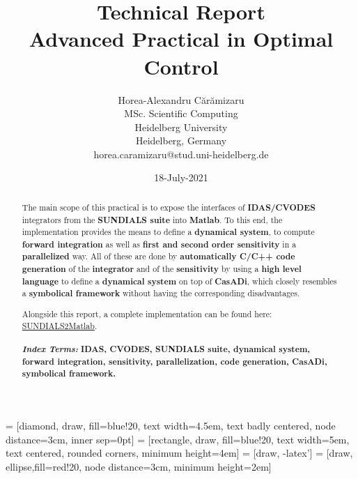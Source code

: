 \documentclass[12pt, letterpaper]{article}
\begin{document}
 = [diamond, draw, fill=blue!20, 
    text width=4.5em, text badly centered, node distance=3cm, inner sep=0pt]
 = [rectangle, draw, fill=blue!20, 
    text width=5em, text centered, rounded corners, minimum height=4em]
 = [draw, -latex']
 = [draw, ellipse,fill=red!20, node distance=3cm,
    minimum height=2em]


\title{Technical Report \\  Advanced Practical in Optimal Control }



\author{Horea-Alexandru C\u{a}r\u{a}mizaru \\
MSc. Scientific Computing\\
Heidelberg University \\
Heidelberg, Germany \\
horea.caramizaru@stud.uni-heidelberg.de
}
\date{18-July-2021}


\maketitle

\begin{abstract}

The main scope of this practical is to expose the interfaces of \textbf{IDAS/CVODES} integrators from the \textbf{SUNDIALS suite} \cite{hindmarsh2005sundials} into \textbf{Matlab}. To this end, the implementation provides the means to define a \textbf{dynamical system}, to compute \textbf{forward integration} as well as \textbf{first and second order sensitivity} in a \textbf{parallelized} way. All of these are done by \textbf{automatically C/C++ code generation} of the \textbf{integrator} and of the \textbf{sensitivity} by using a \textbf{high level language} to define a \textbf{dynamical system} on top of \textbf{CasADi}, which closely resembles a \textbf{symbolical framework} without having the corresponding disadvantages.

Alongside this report, a complete implementation can be found here: \href{https://github.com/nashmit/SUNDIALS2Matlab}{SUNDIALS2Matlab}.
\\
\\
\textbf{\textit{Index Terms:}} \textbf{IDAS, CVODES, SUNDIALS suite, dynamical system, forward integration, sensitivity, parallelization, code generation, CasADi, symbolical framework.}

\end{abstract}
\end{document}
